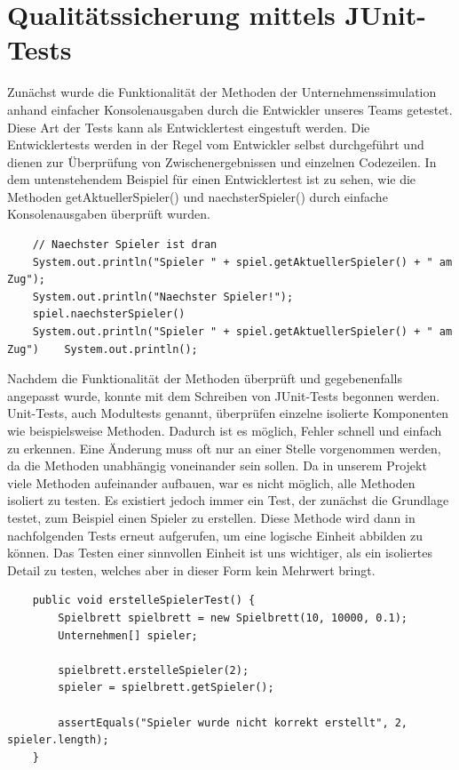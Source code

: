 \clearpage
\chapter{Qualitätssicherung mittels JUnit-Tests}

Zunächst wurde die Funktionalität der Methoden der Unternehmenssimulation anhand einfacher Konsolenausgaben durch die Entwickler unseres Teams getestet. Diese Art der Tests kann als Entwicklertest eingestuft werden. Die Entwicklertests werden in der Regel vom Entwickler selbst durchgeführt und dienen zur Überprüfung von Zwischenergebnissen und einzelnen Codezeilen. In dem untenstehendem Beispiel für einen Entwicklertest ist zu sehen, wie die Methoden getAktuellerSpieler() und naechsterSpieler() durch einfache Konsolenausgaben überprüft wurden.

\lstset{language=Java}
\begin{lstlisting}
	// Naechster Spieler ist dran 
	System.out.println("Spieler " + spiel.getAktuellerSpieler() + " am Zug");
	System.out.println("Naechster Spieler!");
	spiel.naechsterSpieler()	
	System.out.println("Spieler " + spiel.getAktuellerSpieler() + " am Zug")	System.out.println();
\end{lstlisting}

Nachdem die Funktionalität der Methoden überprüft und gegebenenfalls angepasst wurde, konnte mit dem Schreiben von JUnit-Tests begonnen werden. Unit-Tests, auch Modultests genannt, überprüfen einzelne isolierte Komponenten wie beispielsweise Methoden. Dadurch ist es möglich, Fehler schnell und einfach zu erkennen. Eine Änderung muss oft nur an einer Stelle vorgenommen werden, da die Methoden unabhängig voneinander sein sollen. Da in unserem Projekt viele Methoden aufeinander aufbauen, war es nicht möglich, alle Methoden isoliert zu testen. Es existiert jedoch immer ein Test, der zunächst die Grundlage testet, zum Beispiel einen Spieler zu erstellen. Diese Methode wird dann in nachfolgenden Tests erneut aufgerufen, um eine logische Einheit abbilden zu können. Das Testen einer sinnvollen Einheit ist uns wichtiger, als ein isoliertes Detail zu testen, welches aber in dieser Form kein Mehrwert bringt.

\lstset{language=Java}
\begin{lstlisting}
	public void erstelleSpielerTest() {
		Spielbrett spielbrett = new Spielbrett(10, 10000, 0.1);
		Unternehmen[] spieler;
		
		spielbrett.erstelleSpieler(2);
		spieler = spielbrett.getSpieler();
		
		assertEquals("Spieler wurde nicht korrekt erstellt", 2, spieler.length);
	}
\end{lstlisting}

